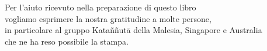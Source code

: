 \cleartorecto
\thispagestyle{empty}

\mbox{}
\vfill

{\centering

Per l’aiuto ricevuto nella preparazione di questo libro\\
vogliamo esprimere la nostra gratitudine a molte persone,\\
in particolare al gruppo Kataññutā della Malesia, Singapore e Australia\\
che ne ha reso possibile la stampa.

}

\vspace*{4\baselineskip}

\vfill
\mbox{}

